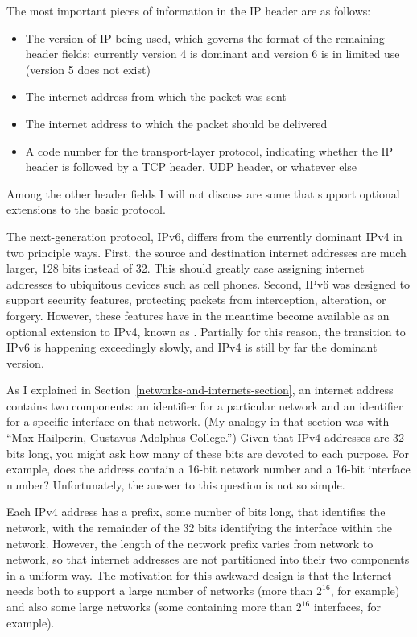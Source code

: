 The most important pieces of information in
the IP header are as follows:
\begin{itemize}
\item
The version of IP being used, which governs the format of the
remaining header fields; currently version 4 is dominant and version 6
is in limited use (version 5 does not exist)
\item
The internet address from which the packet was sent
\item
The internet address to which the packet should be delivered
\item
A code number for the transport-layer protocol, indicating whether the
IP header is followed by a TCP header, UDP header, or whatever else
\end{itemize}
Among the other header fields I will not discuss are some that support
optional extensions to the basic protocol.

The next-generation protocol, IPv6, differs from the currently dominant
IPv4 in two principle ways.  First, the source and destination
internet addresses are much larger, 128 bits instead of 32.  This
should greatly ease assigning internet addresses to ubiquitous devices
such as cell phones.  Second, IPv6 was designed to support security
features, protecting packets from interception, alteration, or
forgery.  However, these features have in the meantime become
available as an optional extension to IPv4, known as .
Partially for this reason, the transition to IPv6 is happening
exceedingly slowly, and IPv4 is still by far the dominant version.

As I explained in Section~\ref{networks-and-internets-section}, an
internet address contains two components: an identifier for a
particular network and an identifier for a specific interface on that
network.  (My analogy in that section was with ``Max Hailperin,
Gustavus Adolphus College.'')  Given that IPv4 addresses are 32 bits
long, you might ask how many of these bits are devoted to each
purpose.  For example, does the address contain a 16-bit network
number and a 16-bit interface number?  Unfortunately, the answer to
this question is not so simple.

Each IPv4 address has a prefix, some number of bits long, that
identifies the network, with the remainder of the 32 bits identifying
the interface within the network.  However, the length of the network
prefix varies from network to network, so that internet addresses are
not partitioned into their two components in a uniform way.
The motivation for this awkward design is that the Internet needs both
to support a large number of networks (more than $2^{16}$, for example)
and also some large networks (some containing more than $2^{16}$
interfaces, for example).

